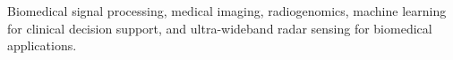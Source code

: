 
Biomedical signal processing, medical imaging, radiogenomics, machine learning
for clinical decision support, and ultra-wideband radar sensing for biomedical
applications.

